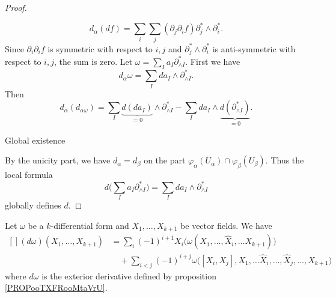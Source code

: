 \begin{proof}
\begin{subproof}
		\begin{equation}
			d_{\alpha}(df)=\sum_i\sum_j(\partial_j\partial_if)\partial^*_j\wedge\partial^*_i.
		\end{equation}
		Since \( \partial_i\partial_if\) is symmetric with respect to \( i,j\) and \( \partial^*_j\wedge\partial^*_i\) is anti-symmetric with respect to \( i,j\), the sum is zero.
		Let \( \omega=\sum_Ia_I\partial^*_{\wedge I}\). First we have
		\begin{equation}
			d_{\alpha}\omega=\sum_Ida_I\wedge\partial^*_{\wedge I}.
		\end{equation}
		Then
		\begin{equation}
			d_{\alpha}(d_{\alpha\omega})=\sum_I\underbrace{d(da_I)}_{=0}\wedge\partial^*_{\wedge I}-\sum_Ida_I\wedge \underbrace{d(\partial^*_{\wedge I})}_{=0}.
		\end{equation}
	\end{subproof}
	\begin{proofpart}
		Global existence
	\end{proofpart}
	By the unicity part, we have \( d_{\alpha}=d_{\beta}\) on the part \( \varphi_{\alpha}(U_{\alpha})\cap\varphi_{\beta}(U_{\beta})\). Thus the local formula
	\begin{equation}
		d\big( \sum_Ia_I\partial^*_{\wedge I} \big)  =\sum_Ida_I\wedge\partial^*_{\wedge I}
	\end{equation}
	globally defines \( d\).
\end{proof}

\begin{proposition}		\label{PROPooUOQRooAdvYqx}
	Let \( \omega\) be a \( k\)-differential form and \( X_1,\ldots,X_{k+1}\) be vector fields. We have
	\begin{equation}
		\begin{aligned}[]
			(d\omega)(X_1,\ldots,X_{k+1}) & =\sum_i(-1)^{i+1}X_i\big( \omega(X_1,\ldots,\hat X_i,\ldots X_{k+1}) \big)                              \\
			                              & \quad+\sum_{i<j}(-1)^{i+j}\omega\big( [X_i,X_j],X_1,\ldots\hat X_i,\ldots,\hat X_j,\ldots,X_{k+1} \big)
		\end{aligned}
	\end{equation}
	where \( d\omega\) is the exterior derivative defined by proposition \ref{PROPooTXFRooMtaVrU}.
\end{proposition}

